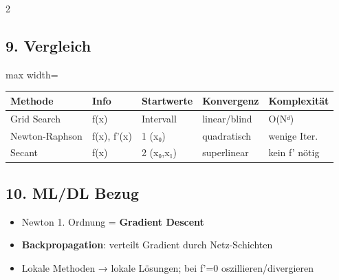 \documentclass[10pt, a4paper]{article}
\begin{document}
\begin{multicols}{2}
\subsection{9. Vergleich}


{\small
\begin{adjustbox}{max width=\linewidth}
{\scriptsize
\begin{tabular}{lllll}
\toprule
\textbf{Methode} & \textbf{Info} & \textbf{Startwerte} & \textbf{Konvergenz} & \textbf{Komplexität} \\
\midrule
Grid Search & f(x) & Intervall & linear/blind & O(Nᵈ) \\
Newton-Raphson & f(x), f'(x) & 1 (x₀) & quadratisch & wenige Iter. \\
Secant & f(x) & 2 (x₀,x₁) & superlinear & kein f' nötig \\
\bottomrule
\end{tabular}
}
\end{adjustbox}
}



\subsection{10. ML/DL Bezug}

\begin{itemize}
  \item Newton 1. Ordnung = \textbf{Gradient Descent}
  \item \textbf{Backpropagation}: verteilt Gradient durch Netz-Schichten
  \item Lokale Methoden → lokale Lösungen; bei f'=0 oszillieren/divergieren
\end{itemize}







\end{multicols}
\end{document}
